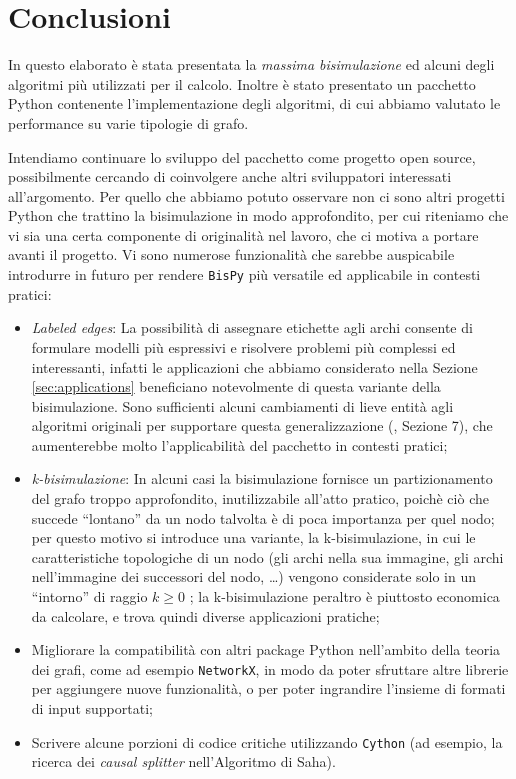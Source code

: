 \section*{Conclusioni}
\label{sec:conclusions}

In questo elaborato è stata presentata la \emph{massima bisimulazione} ed alcuni degli algoritmi più utilizzati per il calcolo. Inoltre è stato presentato un pacchetto Python contenente l'implementazione degli algoritmi, di cui abbiamo valutato le performance su varie tipologie di grafo.

Intendiamo continuare lo sviluppo del pacchetto come progetto open source, possibilmente cercando di coinvolgere anche altri sviluppatori interessati all'argomento. Per quello che abbiamo potuto osservare non ci sono altri progetti Python che trattino la bisimulazione in modo approfondito, per cui riteniamo che vi sia una certa componente di originalità nel lavoro, che ci motiva a portare avanti il progetto. Vi sono numerose funzionalità che sarebbe auspicabile introdurre in futuro per rendere \texttt{BisPy} più versatile ed applicabile in contesti pratici:
\begin{itemize}
    \item \emph{Labeled edges}: La possibilità di assegnare etichette agli archi consente di formulare modelli più espressivi e risolvere problemi più complessi ed interessanti, infatti le applicazioni che abbiamo considerato nella Sezione \ref{sec:applications} beneficiano notevolmente di questa variante della bisimulazione. Sono sufficienti alcuni cambiamenti di lieve entità agli algoritmi originali per supportare questa generalizzazione (\cite{dovier}, Sezione 7), che aumenterebbe molto l'applicabilità del pacchetto in contesti pratici;
    \item \emph{k-bisimulazione}: In alcuni casi la bisimulazione fornisce un partizionamento del grafo troppo approfondito, inutilizzabile all'atto pratico, poichè ciò che succede ``lontano'' da un nodo talvolta è di poca importanza per quel nodo; per questo motivo si introduce una variante, la k-bisimulazione, in cui le caratteristiche topologiche di un nodo (gli archi nella sua immagine, gli archi nell'immagine dei successori del nodo, \dots) vengono considerate solo in un ``intorno'' di raggio $k \geq 0$ \cite{kbisi}; la k-bisimulazione peraltro è piuttosto economica da calcolare, e trova quindi diverse applicazioni pratiche;
    \item Migliorare la compatibilità con altri package Python nell'ambito della teoria dei grafi, come ad esempio \texttt{NetworkX}, in modo da poter sfruttare altre librerie per aggiungere nuove funzionalità, o per poter ingrandire l'insieme di formati di input supportati;
    \item Scrivere alcune porzioni di codice critiche utilizzando \texttt{Cython} (ad esempio, la ricerca dei \emph{causal splitter} nell'Algoritmo di Saha).
\end{itemize}
